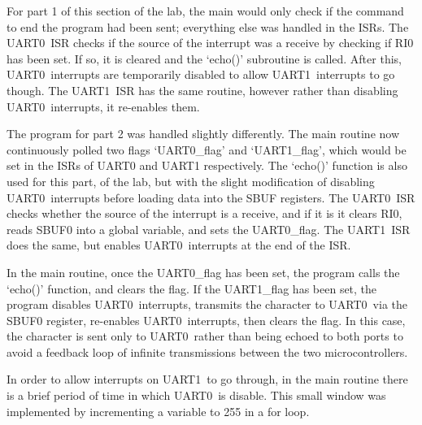 \documentclass[12pt]{article}
\newcommand{\uz}{UART0}
\newcommand{\uo}{UART1}
\begin{document}
For part 1 of this section of the lab, the main would only check if the command to end the program had been sent; everything else was handled in the ISRs. The \uz\ ISR checks if the source of the interrupt was a receive by checking if RI0 has been set. If so, it is cleared and the `echo()' subroutine is called. After this, \uz\ interrupts are temporarily disabled to allow \uo\ interrupts to go though. The \uo\ ISR has the same routine, however rather than disabling \uz\ interrupts, it re-enables them.

The program for part 2 was handled slightly differently. The main routine now continuously polled two flags `UART0\_flag' and `UART1\_flag', which would be set in the ISRs of UART0 and UART1 respectively. The `echo()' function is also used for this part, of the lab, but with the slight modification of disabling \uz\ interrupts before loading data into the SBUF registers. The \uz\ ISR checks whether the source of the interrupt is a receive, and if it is it clears RI0, reads SBUF0 into a global variable, and sets the \uz\_flag. The \uo\ ISR does the same, but enables \uz\ interrupts at the end of the ISR. 

In the main routine, once the \uz\_flag has been set, the program calls the `echo()' function, and clears the flag. If the \uo\_flag has been set, the program disables \uz\ interrupts, transmits the character to \uz\ via the SBUF0 register, re-enables \uz\ interrupts, then clears the flag. In this case, the character is sent only to \uz\ rather than being echoed to both ports to avoid a feedback loop of infinite transmissions between the two microcontrollers.

In order to allow interrupts on \uo\ to go through, in the main routine there is a brief period of time in which \uz\ is disable. This small window was implemented by incrementing a variable to 255 in a for loop.
\end{document}
